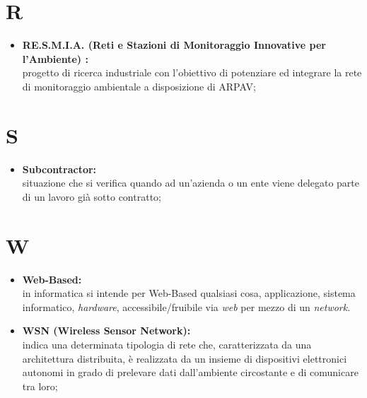 \documentclass[11pt]{book}              %
\begin{document}
\section*{R}
\begin{itemize}

\item \textbf{{\color{OliveGreen}RE.S.M.I.A.} (Reti e Stazioni di Monitoraggio Innovative per l'Ambiente) :}\\
progetto di ricerca industriale con l'obiettivo di potenziare ed integrare la rete di monitoraggio ambientale a disposizione di ARPAV;

\end{itemize}

\section*{S}

\begin{itemize}

	\item \textbf{{\color{Plum} Subcontractor}:}\\
	situazione che si verifica quando ad un'azienda o un ente viene delegato parte di un lavoro già sotto contratto;

\end{itemize}

\section*{W}
\begin{itemize}
	\item \textbf{{\color{Plum}Web-Based}:} \\
	in informatica si intende per Web-Based qualsiasi cosa, applicazione, sistema informatico, \textit{hardware}, accessibile/fruibile via \textit{web} per mezzo di un \textit{network}.
	
	\item \textbf{{\color{OliveGreen} WSN} (Wireless Sensor Network):} \\
	 indica una determinata tipologia di rete che, caratterizzata da una architettura distribuita, è realizzata da un insieme di dispositivi elettronici autonomi in grado di prelevare dati dall'ambiente circostante e di comunicare tra loro;


\end{itemize}
\end{document}
